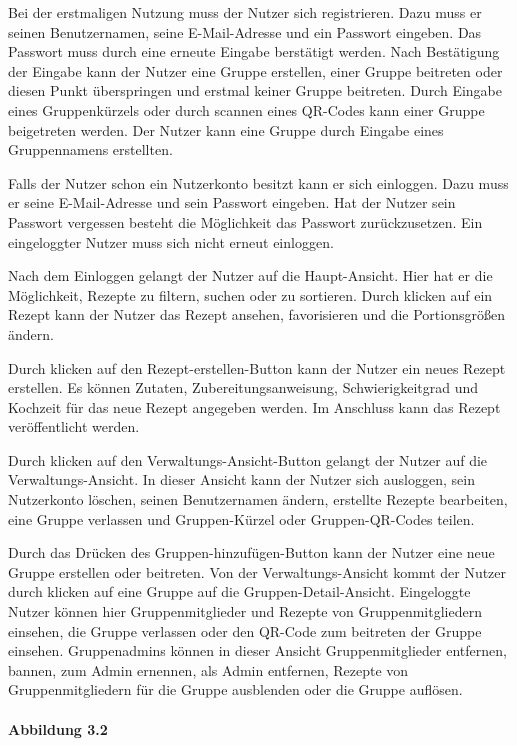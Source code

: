 \documentclass[parskip=full]{scrartcl}
\begin{document}
Bei der erstmaligen Nutzung muss der Nutzer sich registrieren.
Dazu muss er seinen Benutzernamen, seine E-Mail-Adresse und ein Passwort eingeben.
Das Passwort muss durch eine erneute Eingabe berstätigt werden.
Nach Bestätigung der Eingabe kann der Nutzer eine Gruppe erstellen, einer Gruppe beitreten oder diesen Punkt überspringen und erstmal keiner Gruppe beitreten.
Durch Eingabe eines Gruppenkürzels oder durch scannen eines QR-Codes kann einer Gruppe beigetreten werden.
Der Nutzer kann eine Gruppe durch Eingabe eines Gruppennamens erstellten.\par
Falls der Nutzer schon ein Nutzerkonto besitzt kann er sich einloggen.
Dazu muss er seine E-Mail-Adresse und sein Passwort eingeben.
Hat der Nutzer sein Passwort vergessen besteht die Möglichkeit das Passwort zurückzusetzen.
Ein eingeloggter Nutzer muss sich nicht erneut einloggen.\par
Nach dem Einloggen gelangt der Nutzer auf die Haupt-Ansicht.
Hier hat er die Möglichkeit, Rezepte zu filtern, suchen oder zu sortieren.
Durch klicken auf ein Rezept kann der Nutzer das Rezept ansehen, favorisieren und die Portionsgrößen ändern.\par
Durch klicken auf den Rezept-erstellen-Button kann der Nutzer ein neues Rezept erstellen.
Es können Zutaten, Zubereitungsanweisung, Schwierigkeitgrad und Kochzeit ƒür das neue Rezept angegeben werden.
Im Anschluss kann das Rezept veröffentlicht werden.\par
Durch klicken auf den Verwaltungs-Ansicht-Button
gelangt der Nutzer auf die Verwaltungs-Ansicht.
In dieser Ansicht kann der Nutzer sich ausloggen, sein Nutzerkonto löschen, seinen Benutzernamen ändern,
erstellte Rezepte bearbeiten, eine Gruppe verlassen und Gruppen-Kürzel oder Gruppen-QR-Codes teilen.\par
Durch das Drücken des Gruppen-hinzufügen-Button kann der Nutzer eine neue Gruppe erstellen oder beitreten.
Von der Verwaltungs-Ansicht kommt der Nutzer durch klicken auf eine Gruppe auf die Gruppen-Detail-Ansicht.
Eingeloggte Nutzer können hier Gruppenmitglieder und Rezepte von Gruppenmitgliedern einsehen, die Gruppe verlassen oder den QR-Code zum beitreten der Gruppe einsehen.
Gruppenadmins können in dieser Ansicht Gruppenmitglieder entfernen, bannen, zum Admin ernennen, als Admin entfernen, Rezepte von Gruppenmitgliedern für die Gruppe ausblenden oder die Gruppe auflösen.\par


\paragraph{Abbildung 3.2}
\end{document}

